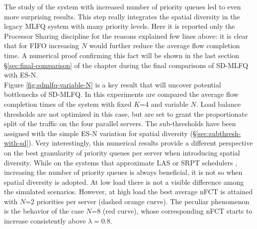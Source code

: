 
The study of the system with increased number of priority queues led to even more surprising results. This step really integrates the spatial diversity in the legacy MLFQ system with many priority levels. Here it is reported only the Processor Sharing discipline for the reasons explained few lines above: it is clear that for FIFO increasing $N$ would further reduce the average flow completion time. A numerical proof confirming this fact will be shown in the last section \S \ref{sec:final-comparison} of the chapter during the final comparisons of SD-MLFQ with ES-N. \\
Figure \ref{fig:sdmlfq-variable-N} is a key result that will uncover potential bottlenecks of SD-MLFQ. In this experiments are compared the average flow completion times of the system with fixed $K$=4 and variable $N$. Load balance thresholds are not optimized in this case, but are set to grant the proportionate split of the traffic on the four parallel servers. The sub-thresholds have been assigned with the simple ES-N variation for spatial diversity (\S \ref{sec:subthresh-with-sd}). Very interestingly, this numerical results provide a different perspective on the best granularity of priority queues per server when introducing spatial diversity. While on the systems that approximate LAS or SRPT schedulers \cite{pias, pFabric}, increasing the number of priority queues is always beneficial, it is not so when spatial diversity is adopted. At low load there is not a visible difference among the simulated scenarios. However, at high load the best average nFCT is attained with $N$=2 priorities per server (dashed orange curve). The peculiar phenomenon is the behavior of the case $N$=8 (red curve), whose corresponding nFCT starts to increase consistently above $\lambda=0.8$. 
